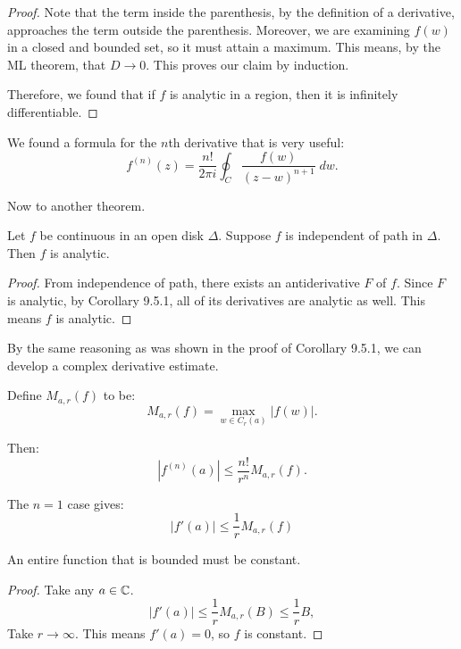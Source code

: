 \documentclass[notes]{subfile}
\begin{document}
\begin{proof}
    Note that the term inside the parenthesis, by the definition of a derivative, approaches the term outside the parenthesis.
    Moreover, we are examining $f(w)$ in a closed and bounded set, so it must attain a maximum.
    This means, by the ML theorem, that $D \to 0$.
    This proves our claim by induction.

    Therefore, we found that if $f$ is analytic in a region, then it is infinitely differentiable.


\end{proof}

We found a formula for the $n$th derivative that is very useful:
\[ f^{(n)} (z) = \frac{n!}{2\pi i} \oint_{C} \frac{f(w)}{(z-w)^{n+1}} \; dw. \]

Now to another theorem.
\begin{theorem}
    Let $f$ be continuous in an open disk $\Delta$.
    Suppose $f$ is independent of path in $\Delta$.
    Then $f$ is analytic.
\end{theorem}

\begin{proof}
    From independence of path, there exists an antiderivative $F$ of $f$.
    Since $F$ is analytic, by Corollary 9.5.1, all of its derivatives are analytic as well.
    This means $f$ is analytic.
\end{proof}

By the same reasoning as was shown in the proof of Corollary 9.5.1, we can develop a complex derivative estimate.
\begin{definition}
    Define $M_{a,r} (f)$ to be:
    \[ M_{a,r}(f) = \max_{w \in C_r(a)} |f(w)|.\]
\end{definition}

Then:
\[ |f^{(n)}(a)| \le \frac{n!}{r^n} M_{a,r}(f). \]

\begin{cor}
    The $n = 1$ case gives:
    \[ |f'(a) | \le \frac{1}{r} M_{a,r}(f) \]
\end{cor}

\begin{cor}
    An entire function that is bounded must be constant.
\end{cor}

\begin{proof}
    Take any $a \in \operatorname{\mathbb{C}}$.
    \[ |f'(a)| \le \frac{1}{r} M_{a,r}(B) \le \frac{1}{r}B, \]
    Take $r \to \infty$.
    This means $f'(a) = 0$, so $f$ is constant.
\end{proof}
\end{document}
